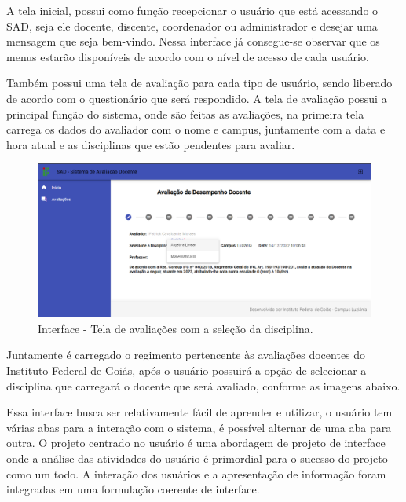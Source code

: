     A tela inicial, possui como função recepcionar o usuário que está acessando o SAD, seja ele docente, discente, coordenador ou administrador e desejar uma mensagem que seja bem-vindo. Nessa interface já consegue-se observar que os menus estarão disponíveis de acordo com o nível de acesso de cada usuário.     
     
    Também possui uma tela de avaliação para cada tipo de usuário, sendo liberado de acordo com o questionário que será respondido. A tela de avaliação possui a principal função do sistema, onde são feitas as avaliações, na primeira tela carrega os dados do avaliador com o nome e campus, juntamente com a data e hora atual e as disciplinas que estão pendentes para avaliar. 
 
        \begin{figure}[h]
        \centering
        \includegraphics[width=1.0\textwidth]{./img/AvaliaçõesDocente.png}
        \caption{Interface - Tela de avaliações com a seleção da disciplina.}
        \label{fig:Selececao}
        \end{figure}
        
    Juntamente é carregado o regimento pertencente às avaliações docentes do Instituto Federal de Goiás, após o usuário possuirá a opção de selecionar  a disciplina que carregará o docente que será avaliado, conforme as imagens abaixo. 
    
    Essa interface busca ser relativamente fácil de aprender e utilizar, o usuário tem várias abas para a interação com o sistema, é possível alternar de uma aba para outra. O projeto centrado no usuário é uma abordagem de projeto de interface onde a análise das atividades do usuário é primordial para o sucesso do projeto como um todo. A interação dos usuários e a apresentação de informação foram integradas em uma formulação coerente de interface.

